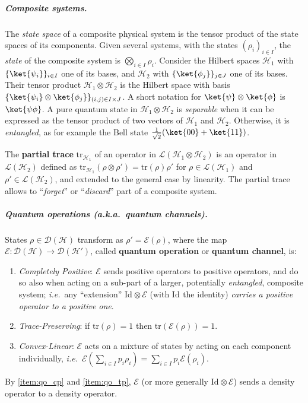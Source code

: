\documentclass[10pt,a4paper]{article}
\newcommand*{\ie}{\emph{i.e.}\xspace}
\newcommand*{\aka}{\emph{a.k.a.}}
\newcommand*{\definitive}[1]{\textbf{#1}}
\newcommand{\netE}{\mathcal E}
\newcommand{\E}{\netE}
\newcommand{\tr}[1]{\mathrm{tr}\left(#1\right)}
\newcommand{\ptr}[1]{\mathrm{tr}_{#1}}
\renewcommand{\L}{\mathcal{L}}
\newcommand{\D}{\mathcal{D}}
\newcommand{\Eop}{\mathcal E}
\newcommand{\HH}{\mathcal{H}}
\newcommand{\M}{\rho}
\newcommand*{\id}[1][]{\mathrm{Id}_{#1}}
\newcommand{\idop}{\id}
\begin{document}
\subparagraph{Composite systems.}

The \emph{state space} of a composite physical system is the tensor product of the state spaces of its components.
Given several systems, with the states $(\rho_i)_{i\in I}$, the \emph{state} of the composite system is $\bigotimes_{i\in I}\rho_i$.
Consider the Hilbert spaces $\HH_1$ with $\{\ket{\psi_i}\}_{i\in I}$ one of its bases, and $\HH_2$ with $\{\ket{\phi_j}\}_{j\in J}$ one of its bases.
Their tensor product $\HH_1 \otimes \HH_2$ is the Hilbert space with basis $\{\ket{\psi_i} \otimes \ket{\phi_j}\}_{(i,j)\in I\times J}$.
A short notation for $\ket{\psi}\otimes\ket{\phi}$ is $\ket{\psi\phi}$.
A pure quantum state in $\HH_1 \otimes \HH_2$ is \emph{separable} when it can be expressed as the tensor product of two vectors of $\HH_1$ and $\HH_2$.
Otherwise, it is \emph{entangled}, as for example the Bell state $\frac{1}{\sqrt{2}}(\ket{00} + \ket{11})$.

The \definitive{partial trace} $\ptr{\HH_1}$ of an operator in $\L(\HH_1\otimes\HH_2)$ is an operator in $\L(\HH_2)$ defined as $\ptr{\HH_1}\left(\M\otimes\M'\right)=\tr{\M}\M'$ for $\M\in\L(\HH_1)$ and $\M'\in\L(\HH_2)$, and extended to the general case by linearity.
The partial trace allows to ``\emph{forget}'' or ``\emph{discard}'' part of a composite system.

\subparagraph{Quantum operations (\aka\ quantum channels).}

States $\M\in\D(\HH)$ transform as $\M' = \E(\M)$, where the map $\E: {\D}(\mathcal{H}) \to {\D}(\mathcal{H'})$, called \definitive{quantum operation} or \definitive{quantum channel}, is:
\begin{enumerate}
\item\label{item:qo_cp}
\emph{Completely Positive}:
$\E$ sends positive operators to positive operators, and do so also when acting on a sub-part of a larger, potentially \emph{entangled}, composite system; \ie\ any ``extension'' $\idop\otimes \Eop$ (with $\idop$ the identity) \emph{carries a positive operator to a positive one}.
\item\label{item:qo_tp}
\emph{Trace-Preserving}:
if $\tr{\rho}=1$ then $\tr{\E(\rho)}=1$.
\item\label{item:qo_l}
\emph{Convex-Linear}:
$\E$ acts on a mixture of states by acting on each component individually, \ie\ $\Eop\left(\sum_{i\in I}p_{i}\M_{i}\right) = \sum_{i\in I}p_{i}\Eop(\rho_{i})$.
\end{enumerate}
By \ref{item:qo_cp} and \ref{item:qo_tp}, $\Eop$ (or more generally $\idop\otimes\Eop$) sends a density operator to a density operator.
\end{document}
